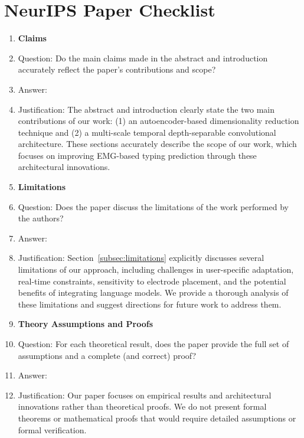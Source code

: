 \section*{NeurIPS Paper Checklist}

\begin{enumerate}

    \item {\bf Claims}
    \item[] Question: Do the main claims made in the abstract and introduction accurately reflect the paper's contributions and scope?
    \item[] Answer: \answerYes{}
    \item[] Justification: The abstract and introduction clearly state the two main contributions of our work: (1) an autoencoder-based dimensionality reduction technique and (2) a multi-scale temporal depth-separable convolutional architecture. These sections accurately describe the scope of our work, which focuses on improving EMG-based typing prediction through these architectural innovations.

    \item {\bf Limitations}
    \item[] Question: Does the paper discuss the limitations of the work performed by the authors?
    \item[] Answer: \answerYes{}
    \item[] Justification: Section~\ref{subsec:limitations} explicitly discusses several limitations of our approach, including challenges in user-specific adaptation, real-time constraints, sensitivity to electrode placement, and the potential benefits of integrating language models. We provide a thorough analysis of these limitations and suggest directions for future work to address them.

    \item {\bf Theory Assumptions and Proofs}
    \item[] Question: For each theoretical result, does the paper provide the full set of assumptions and a complete (and correct) proof?
    \item[] Answer: \answerNA{}
    \item[] Justification: Our paper focuses on empirical results and architectural innovations rather than theoretical proofs. We do not present formal theorems or mathematical proofs that would require detailed assumptions or formal verification.


\end{enumerate}
